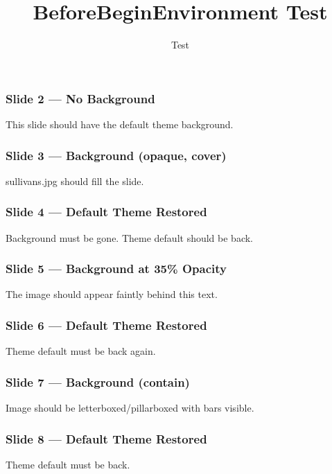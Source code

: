 \documentclass[aspectratio=169]{beamer}
\title{BeforeBeginEnvironment Test}
\author{Test}
\date{}
\newif\ifbgpending  %
\newif\ifbgopaque   %
\newif\ifbgactive   %
\gdef\bgpendingimage{}
\gdef\bgpendingsize{cover}
\gdef\bgpendingopc{1}
\begin{document}
\begin{frame}
  \titlepage
\end{frame}

\begin{frame}
  \frametitle{Slide 2 — No Background}
  This slide should have the default theme background.
\end{frame}

\gdef\bgpendingimage{/home/user/pandoc-course-template/lectures/img/sullivans.jpg}
\gdef\bgpendingsize{cover}
\global\bgopaquetrue
\global\bgpendingtrue

\begin{frame}
  \frametitle{Slide 3 — Background (opaque, cover)}
  sullivans.jpg should fill the slide.
\end{frame}

\begin{frame}
  \frametitle{Slide 4 — Default Theme Restored}
  Background must be gone. Theme default should be back.
\end{frame}

\gdef\bgpendingimage{/home/user/pandoc-course-template/lectures/img/sullivans.jpg}
\gdef\bgpendingsize{cover}
\gdef\bgpendingopc{0.35}
\global\bgopaquefalse
\global\bgpendingtrue

\begin{frame}
  \frametitle{Slide 5 — Background at 35\% Opacity}
  The image should appear faintly behind this text.
\end{frame}

\begin{frame}
  \frametitle{Slide 6 — Default Theme Restored}
  Theme default must be back again.
\end{frame}

\gdef\bgpendingimage{/home/user/pandoc-course-template/lectures/img/sullivans.jpg}
\gdef\bgpendingsize{contain}
\global\bgopaquetrue
\global\bgpendingtrue

\begin{frame}
  \frametitle{Slide 7 — Background (contain)}
  Image should be letterboxed/pillarboxed with bars visible.
\end{frame}

\begin{frame}
  \frametitle{Slide 8 — Default Theme Restored}
  Theme default must be back.
\end{frame}
\end{document}

